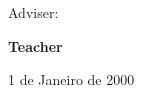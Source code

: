 \begin{titlepage}
  \begin{center}
    \begin{normalsize}
      \begin{large}
        Adviser:
      \end{large}
    \end{normalsize}
  \end{center}

  \vspace{0.2cm}

  \begin{center}
    \begin{large}
      \textbf{Teacher}
    \end{large}
  \end{center}

  \vspace{2cm}

  \begin{center}
    \begin{normalsize}
      1 de Janeiro de 2000
    \end{normalsize}
  \end{center}
\end{titlepage}
